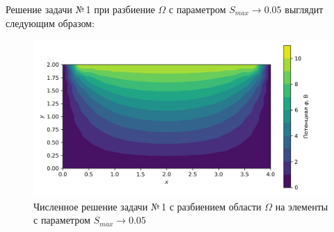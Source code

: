 \documentclass[12pt, a4paper]{article}
\begin{document}
			\newpage
			
			Решение задачи №\,1 при разбиение $\Omega$ с параметром $S_{max} \rightarrow 0.05$ выглядит следующим образом: 
			\vspace*{-5mm}
			\begin{figure}[!h]
				\centering
				\includegraphics[width=1\textwidth]{rect_dirichlet_only_005_calfem.png}
				\caption{Численное решение задачи №\,1 с разбиением области $\Omega$ на элементы с параметром $S_{max} \rightarrow 0.05$}
				\label{fig:dom_rect_005}
			\end{figure}
			
\end{document}
